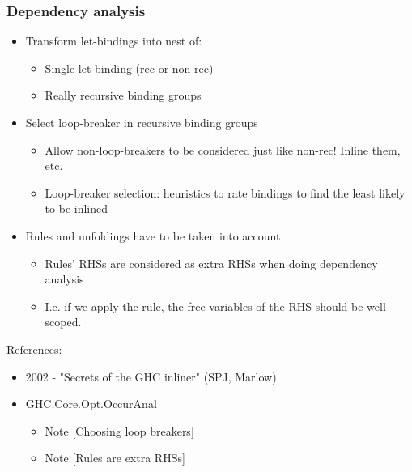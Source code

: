 \documentclass[aspectratio=169]{beamer}
\begin{document}
\begin{frame}
  \frametitle{Dependency analysis}

  \begin{itemize}
    \item Transform let-bindings into nest of:
      \begin{itemize}
        \item Single let-binding (rec or non-rec)
        \item Really recursive binding groups
      \end{itemize}

    \item Select loop-breaker in recursive binding groups
      \begin{itemize}
        \item Allow non-loop-breakers to be considered just like non-rec!
          Inline them, etc.
        \item Loop-breaker selection: heuristics to rate bindings to find
          the least likely to be inlined
      \end{itemize}

    \item Rules and unfoldings have to be taken into account
      \begin{itemize}
        \item Rules' RHSs are considered as extra RHSs when doing dependency
          analysis
        \item I.e. if we apply the rule, the free variables of the RHS should be well-scoped.
      \end{itemize}
  \end{itemize}

  References:
  \begin{itemize}
    \item 2002 - "Secrets of the GHC inliner" (SPJ, Marlow)
    \item GHC.Core.Opt.OccurAnal
      \begin{itemize}
        \item Note [Choosing loop breakers]
        \item Note [Rules are extra RHSs]
      \end{itemize}
  \end{itemize}
\end{frame}
\end{document}

